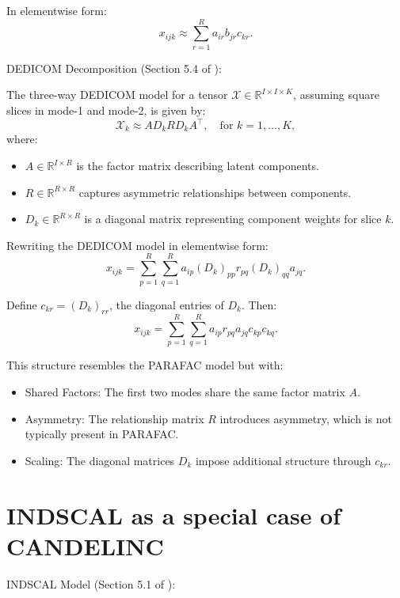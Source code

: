 In elementwise form:
\begin{equation}
    x_{ijk} \approx \sum_{r=1}^{R} a_{ir} b_{jr} c_{kr}.
\end{equation}

DEDICOM Decomposition (Section 5.4 of \cite{kolda2009tensor}):

The three-way DEDICOM model for a tensor \( \mathcal{X} \in \mathbb{R}^{I \times I \times K} \), assuming square slices in mode-1 and mode-2, is given by:
\begin{equation}
    \mathcal{X}_k \approx A D_k R D_k A^\top, \quad \text{for } k = 1, \dots, K,
\end{equation}
where:
\begin{itemize}
    \item \( A \in \mathbb{R}^{I \times R} \) is the factor matrix describing latent components.
    \item \( R \in \mathbb{R}^{R \times R} \) captures asymmetric relationships between components.
    \item \( D_k \in \mathbb{R}^{R \times R} \) is a diagonal matrix representing component weights for slice \( k \).
\end{itemize}

Rewriting the DEDICOM model in elementwise form:
\begin{equation}
    x_{ijk} = \sum_{p=1}^{R} \sum_{q=1}^{R} a_{ip} (D_k)_{pp} r_{pq} (D_k)_{qq} a_{jq}.
\end{equation}

Define \( c_{kr} = (D_k)_{rr} \), the diagonal entries of \( D_k \). Then:
\begin{equation}
    x_{ijk} = \sum_{p=1}^{R} \sum_{q=1}^{R} a_{ip} r_{pq} a_{jq} c_{kp} c_{kq}.
\end{equation}

This structure resembles the PARAFAC model but with:
\begin{itemize}
    \item Shared Factors: The first two modes share the same factor matrix \( A \).
    \item Asymmetry: The relationship matrix \( R \) introduces asymmetry, which is not typically present in PARAFAC.
    \item Scaling: The diagonal matrices \( D_k \) impose additional structure through \( c_{kr} \).
\end{itemize}


\section{INDSCAL as a special case of CANDELINC}
\label{sec:indscal-to-candelinc}
INDSCAL Model (Section 5.1 of \cite{kolda2009tensor}):

